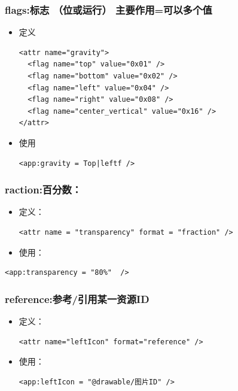 \documentclass[9pt, b5paper]{article}
\begin{document}
\subsubsection{flags:标志 （位或运行） 主要作用=可以多个值}
\label{sec-1-5-4}
\begin{itemize}
\item 定义
\begin{verbatim}
<attr name="gravity">
  <flag name="top" value="0x01" />
  <flag name="bottom" value="0x02" />
  <flag name="left" value="0x04" />
  <flag name="right" value="0x08" />
  <flag name="center_vertical" value="0x16" />
</attr>
\end{verbatim}
\item 使用
\begin{verbatim}
<app:gravity = Top|leftf />
\end{verbatim}
\end{itemize}
\subsubsection{raction:百分数：}
\label{sec-1-5-5}
\begin{itemize}
\item 定义：
\begin{verbatim}
<attr name = "transparency" format = "fraction" />
\end{verbatim}
\item 使用：
\end{itemize}
\begin{verbatim}
<app:transparency = "80%"  />
\end{verbatim}
\subsubsection{reference:参考/引用某一资源ID}
\label{sec-1-5-6}
\begin{itemize}
\item 定义：
\begin{verbatim}
<attr name="leftIcon" format="reference" />
\end{verbatim}
\item 使用：
\begin{verbatim}
<app:leftIcon = "@drawable/图片ID" />
\end{verbatim}
\end{itemize}
\end{document}

